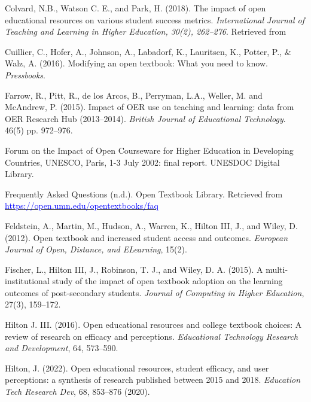 \documentclass[11pt]{article}
\newcommand{\alink}[2]{\href{#1}{\textcolor{blue}{#2}}}
\begin{document}
\begin{thebibliography}{99}
 Colvard, N.\/B., Watson C.\/ E., and Park, H. (2018). The impact of open educational resources on various student success metrics. {\em International Journal of Teaching and Learning in Higher Education, 30(2), 262–276}. Retrieved from

   Cuillier, C., Hofer, A., Johnson, A., Labadorf, K., Lauritsen, K., Potter, P., \& Walz, A. (2016). Modifying an open textbook: What you need to know.  {\em Pressbooks}.%

   Farrow, R., Pitt, R., de los Arcos, B., Perryman, L.A., Weller, M. and McAndrew, P. (2015). Impact of OER use on teaching and learning: data from OER Research Hub (2013–2014). {\em British Journal of Educational Technology}. 46(5) pp. 972–976.

   Forum on the Impact of Open Courseware for Higher Education in Developing Countries, UNESCO, Paris, 1-3 July 2002: final report.  UNESDOC Digital Library.%

   Frequently Asked Questions (n.d.). Open Textbook Library. Retrieved from \alink{https://open.umn.edu/opentextbooks/faq}{https://open.umn.edu/opentextbooks/faq}

   Feldstein, A., Martin, M., Hudson, A., Warren, K., Hilton III, J., and Wiley, D. (2012). Open textbook and increased student access and outcomes. {\em European Journal of Open, Distance, and ELearning}, 15(2).

   Fischer, L., Hilton III, J., Robinson, T. J., and Wiley, D.
  A. (2015). A multi-institutional study of the impact of open textbook adoption on the learning outcomes of post-secondary students. {\em Journal of Computing in Higher Education}, 27(3), 159–172.

   Hilton J. III. (2016). Open educational resources and college textbook choices: A review of research on efficacy and perceptions. {\em Educational Technology Research and Development}, 64, 573–590.

   Hilton, J. (2022). Open educational resources, student efficacy, and user perceptions: a synthesis of research published between 2015 and 2018. {\em Education Tech Research Dev}, 68, 853–876 (2020).%


\end{thebibliography}
\end{document}
